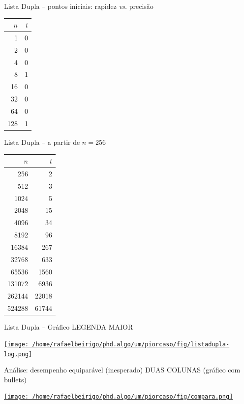 \documentclass[bigger]{beamer}
\begin{document}
\begin{frame}[label=sec-3-1-4]{Lista Dupla -- pontos iniciais: rapidez \emph{vs.} precisão}
\begin{center}
\begin{tabular}{rr}
$n$ & $t$\\
\hline
1 & 0\\
2 & 0\\
4 & 0\\
8 & 1\\
16 & 0\\
32 & 0\\
64 & 0\\
128 & 1\\
\end{tabular}
\end{center}
\end{frame}
\begin{frame}[label=sec-3-1-5]{Lista Dupla -- a partir de $n = 256$}
\begin{center}
\begin{tabular}{rr}
$n$ & $t$\\
\hline
256 & 2\\
512 & 3\\
1024 & 5\\
2048 & 15\\
4096 & 34\\
8192 & 96\\
16384 & 267\\
32768 & 633\\
65536 & 1560\\
131072 & 6936\\
262144 & 22018\\
524288 & 61744\\
\end{tabular}
\end{center}
\end{frame}
\begin{frame}[label=sec-3-1-6]{Lista Dupla -- Gráfico LEGENDA MAIOR}
\begin{center}
\href{fig/listasimples-log.png}{\texttt{[image: /home/rafaelbeirigo/phd.algo/um/piorcaso/fig/listadupla-log.png]}}
\end{center}
\end{frame}
\begin{frame}[label=sec-3-1-7]{Análise: desempenho equiparável (inesperado) DUAS COLUNAS (gráfico com bullets)}
\begin{center}
\href{fig/compara.png}{\texttt{[image: /home/rafaelbeirigo/phd.algo/um/piorcaso/fig/compara.png]}}
\end{center}
\end{frame}
\end{document}
